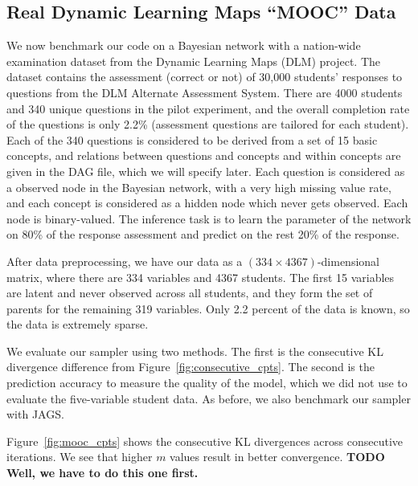 \documentclass{article} %
\begin{document}
\subsection{Real Dynamic Learning Maps ``MOOC'' Data}\label{ssec:mooc_data}

We now benchmark our code on a Bayesian network with a nation-wide examination dataset from the
Dynamic Learning Maps (DLM) project. The dataset contains the assessment (correct or not) of 30,000
students' responses to questions from the DLM Alternate Assessment System. There are 4000 students
and 340 unique questions in the pilot experiment, and the overall completion rate of the questions
is only 2.2\% (assessment questions are tailored for each student). Each of the 340 questions is
considered to be derived from a set of 15 basic concepts, and relations between questions and
concepts and within concepts are given in the DAG file, which we will specify later.  Each question
is considered as a observed node in the Bayesian network, with a very high missing value rate, and
each concept is considered as a hidden node which never gets observed. Each node is binary-valued.
The inference task is to learn the parameter of the network on 80\% of the response assessment and
predict on the rest 20\% of the response.

After data preprocessing, we have our data as a $(334 \times 4367)$-dimensional matrix, where there
are 334 variables and 4367 students. The first 15 variables are latent and never observed across all
students, and they form the set of parents for the remaining 319 variables. Only 2.2 percent of the
data is known, so the data is extremely sparse.

We evaluate our sampler using two methods. The first is the consecutive KL divergence difference
from Figure~\ref{fig:consecutive_cpts}. The second is the prediction accuracy to measure the quality
of the model, which we did not use to evaluate the five-variable student data. As before, we also
benchmark our sampler with JAGS.

Figure~\ref{fig:mooc_cpts} shows the consecutive KL divergences across consecutive iterations. We
see that higher $m$ values result in better convergence. \textbf{TODO Well, we have to do this one
first.}
\end{document}
